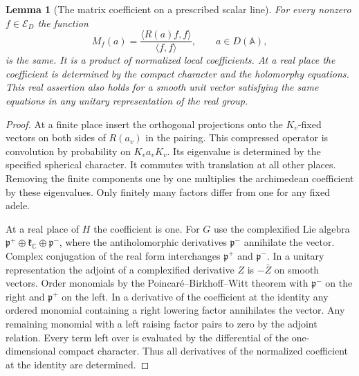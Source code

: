 \documentclass[a4paper,11pt]{article}
\newtheorem{lemma}[proposition]{Lemma}
\theoremstyle{definition}
\theoremstyle{remark}
\numberwithin{equation}{section}
\begin{document}
\begin{lemma}[The matrix coefficient on a prescribed scalar line]
\leavevmode\label{lem:carriermatrix831}
For every nonzero \(f\in\mathcal E_D\) the function
\[
 M_f(a)=\frac{\langle R(a)f,f\rangle}{\langle f,f\rangle},
 \qquad a\in D(\mathbb A),
\]
is the same. It is a product of normalized local coefficients.
At a real place the coefficient is determined by the compact
character and the holomorphy equations. This real assertion
also holds for a smooth unit vector satisfying the same
equations in any unitary representation of the real group.
\end{lemma}
\begin{proof}
At a finite place insert the orthogonal projections onto the
\(K_v\)-fixed vectors on both sides of \(R(a_v)\) in the
pairing. This compressed operator is convolution by probability
on \(K_va_vK_v\). Its eigenvalue is determined by the specified
spherical character. It commutes with translation at all other
places. Removing the finite components one by one multiplies
the archimedean coefficient by these eigenvalues. Only finitely
many factors differ from one for any fixed adele.

At a real place of \(H\) the coefficient is one. For \(G\)
use the complexified Lie algebra
\(\mathfrak p^+\oplus\mathfrak k_{\mathbb C}\oplus\mathfrak p^-\),
where the antiholomorphic derivatives \(\mathfrak p^-\)
annihilate the vector. Complex conjugation of the real form
interchanges \(\mathfrak p^+\) and \(\mathfrak p^-\).
In a unitary representation the adjoint of a complexified
derivative \(Z\) is \(-\bar Z\) on smooth vectors. Order
monomials by the Poincar\'e--Birkhoff--Witt theorem with
\(\mathfrak p^-\) on the right and \(\mathfrak p^+\) on the
left. In a derivative of the coefficient at the identity
any ordered monomial containing a right lowering factor
annihilates the vector. Any remaining monomial with a left
raising factor pairs to zero by the adjoint relation.
Every term left over is evaluated by the differential of
the one-dimensional compact character. Thus all derivatives
of the normalized coefficient at the identity are determined.


\end{proof}
\end{document}
